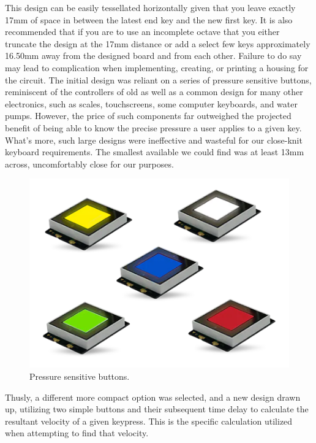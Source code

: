 This design can be easily tessellated horizontally given that you leave exactly
17mm of space in between the latest end key and the new first key. It is also
recommended that if you are to use an incomplete octave that you either truncate
the design at the 17mm distance or add a select few keys approximately 16.50mm
away from the designed board and from each other. Failure to do say may lead to
complication when implementing, creating, or printing a housing for the circuit.
The initial design was reliant on a series of pressure sensitive buttons,
reminiscent of the controllers of old as well as a common design for many other
electronics, such as scales, touchscreens, some computer keyboards, and water
pumps. However, the price of such components far outweighed the projected
benefit of being able to know the precise pressure a user applies to a given
key. What’s more, such large designs were ineffective and wasteful for our
close-knit keyboard requirements. The smallest available we could find was at
least 13mm across, uncomfortably close for our purposes.

\begin{figure}[h!]
  \centering
  \includegraphics[width=\linewidth]{image/pressuresensitivebuttons.png}
  \caption{Pressure sensitive buttons.}
\end{figure}


Thusly, a different more compact option was selected, and a new design drawn up, utilizing
two simple buttons and their subsequent time delay to calculate the resultant velocity of
a given keypress. This is the specific calculation utilized when attempting to find that
velocity.

